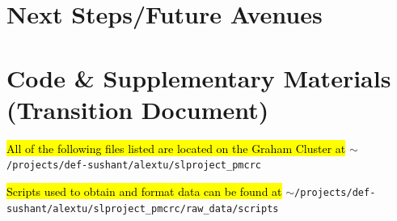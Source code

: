 \documentclass[10pt]{article}
\begin{document}
\section{Next Steps/Future Avenues}








\clearpage\newpage
\section{Code \& Supplementary Materials (Transition Document)}

\hl{All of the following files listed are located on the Graham Cluster at} \texttt{$\sim$/projects/def-sushant/alextu/\newline slproject\_pmcrc}

\hl{Scripts used to obtain and format data can be found at} \texttt{$\sim$/projects/def-sushant/alextu/\newline slproject\_pmcrc/raw\_data/scripts}
\end{document}
